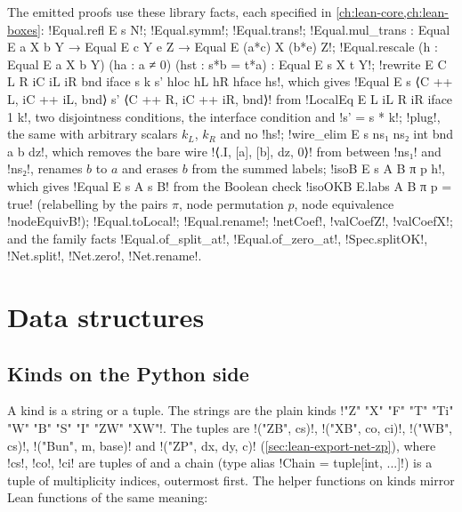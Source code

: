 {The emitted proofs use these library facts, each specified in \cref{ch:lean-core,ch:lean-boxes}:
\lean!Equal.refl E s N!; \lean!Equal.symm!; \lean!Equal.trans!;
\lean!Equal.mul_trans : Equal E a X b Y → Equal E c Y e Z → Equal E (a*c) X (b*e) Z!;
\lean!Equal.rescale (h : Equal E a X b Y) (ha : a ≠ 0) (hst : s*b = t*a) : Equal E s X t Y!;
\lean!rewrite E C L R iC iL iR bnd iface s k s' hloc hL hR hface hs!, which gives
\lean!Equal E s ⟨C ++ L, iC ++ iL, bnd⟩ s' ⟨C ++ R, iC ++ iR, bnd⟩! from
\lean!LocalEq E L iL R iR iface 1 k!, two disjointness conditions, the interface condition and
\lean!s' = s * k!; \lean!plug!, the same with arbitrary scalars $k_L$, $k_R$ and no
\lean!hs!; \lean!wire_elim E s ns₁ ns₂ int bnd a b dz!, which removes the bare wire
\lean!⟨.I, [a], [b], dz, 0⟩! from between \lean!ns₁! and \lean!ns₂!, renames $b$ to $a$ and erases
$b$ from the summed labels; \lean!isoB E s A B π p h!, which gives \lean!Equal E s A s B! from the
Boolean check \lean!isoOKB E.labs A B π p = true! (relabelling by the pairs $\pi$, node
permutation $p$, node equivalence \lean!nodeEquivB!); \lean!Equal.toLocal!; \lean!Equal.rename!;
\lean!netCoef!, \lean!valCoefZ!, \lean!valCoefX!; and the family facts \lean!Equal.of_split_at!,
\lean!Equal.of_zero_at!, \lean!Spec.splitOK!, \lean!Net.split!, \lean!Net.zero!,
\lean!Net.rename!.

\section{Data structures}\label{sec:lean-export-net-data}

\subsection{Kinds on the Python side}\label{sec:lean-export-net-kinds}

A kind is a string or a tuple. The strings are the plain kinds \code!"Z" "X" "F" "T" "Ti" "W" "B" "S" "I" "ZW" "XW"!.
The tuples are \py!("ZB", cs)!, \py!("XB", co, ci)!, \py!("WB", cs)!, \py!("Bun", m, base)! and
\py!("ZP", dx, dy, c)! (\cref{sec:lean-export-net-zp}), where \py!cs!, \py!co!, \py!ci! are tuples of  and a chain (type alias
\py!Chain = tuple[int, ...]!) is a tuple of multiplicity indices, outermost first. The helper
functions on kinds mirror Lean functions of the same meaning:

}
